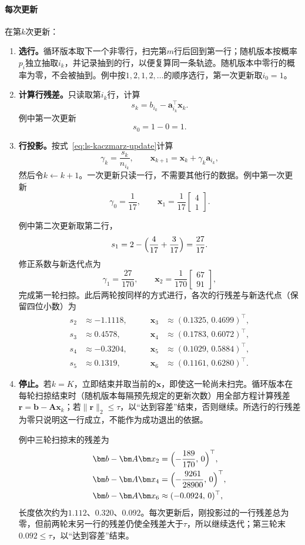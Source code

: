 \paragraph{每次更新}
在第$k$次更新：
\begin{enumerate}
 \item \textbf{选行。}循环版本取下一个非零行，扫完第$m$行后回到第一行；随机版本按概率$p_i$独立抽取$i_k$，并记录抽到的行，以便复算同一条轨迹。随机版本中零行的概率为零，不会被抽到。例中按$1,2,1,2,\ldots$的顺序选行，第一次更新取$i_0=1$。

 \item \textbf{计算行残差。}只读取第$i_k$行，计算
 \[
  s_k=b_{i_k}-\bm a_{i_k}^\top\bm x_k .
 \]
 例中第一次更新
 \[
  s_0=1-0=1 .
 \]

 \item \textbf{行投影。}按式~\eqref{eq:ls-kaczmarz-update}计算
 \[
  \gamma_k=\frac{s_k}{n_{i_k}},\qquad \bm x_{k+1}=\bm x_k+\gamma_k\bm a_{i_k},
 \]
 然后令$k\leftarrow k+1$。一次更新只读一行，不需要其他行的数据。例中第一次更新
 \[
  \gamma_0=\frac1{17},\qquad \bm x_1=\frac1{17}\begin{bmatrix}4\\1\end{bmatrix}.
 \]

 例中第二次更新取第二行，
 \[
  s_1=2-\Bigl(\frac4{17}+\frac3{17}\Bigr)=\frac{27}{17}.
 \]
 修正系数与新迭代点为
 \[
  \gamma_1=\frac{27}{170},\qquad \bm x_2=\frac1{170}\begin{bmatrix}67\\91\end{bmatrix},
 \]
 完成第一轮扫掠。此后两轮按同样的方式进行，各次的行残差与新迭代点（保留四位小数）为
 \[
 \begin{aligned}
  s_2&\approx-1.1118,&\qquad \bm x_3&\approx(0.1325,\,0.4699)^\top,\\
  s_3&\approx0.4578,&\qquad \bm x_4&\approx(0.1783,\,0.6072)^\top,\\
  s_4&\approx-0.3204,&\qquad \bm x_5&\approx(0.1029,\,0.5884)^\top,\\
  s_5&\approx0.1319,&\qquad \bm x_6&\approx(0.1161,\,0.6280)^\top .
 \end{aligned}
 \]

 \item \textbf{停止。}若$k=K$，立即结束并取当前的$\bm x$，即使这一轮尚未扫完。循环版本在每轮扫掠结束时（随机版本每隔预先规定的更新次数）用全部方程计算残差$\bm r=\bm b-\bm A\bm x_k$；若$\lVert\bm r\rVert_2\leq\tau$，以“达到容差”结束，否则继续。所选行的行残差为零只说明这一行成立，不能作为成功退出的依据。

 例中三轮扫掠末的残差为
 \[
 \begin{aligned}
  \bm b-\bm A\bm x_2&=\Bigl(-\frac{189}{170},\,0\Bigr)^\top,\\
  \bm b-\bm A\bm x_4&=\Bigl(-\frac{9261}{28900},\,0\Bigr)^\top,\\
  \bm b-\bm A\bm x_6&\approx(-0.0924,\,0)^\top ,
 \end{aligned}
 \]
 长度依次约为$1.112$、$0.320$、$0.092$。每次更新后，刚投影过的一行残差总为零，但前两轮末另一行的残差仍使全残差大于$\tau$，所以继续迭代；第三轮末$0.092\leq\tau$，以“达到容差”结束。
\end{enumerate}

